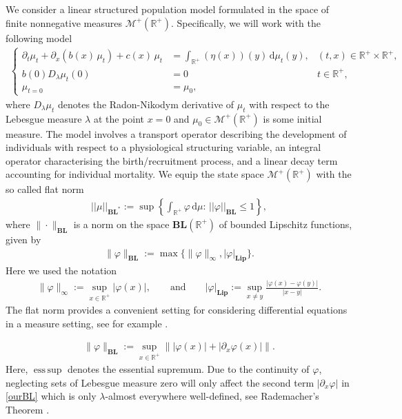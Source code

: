 \documentclass[12pt,a4paper]{amsart}
\newcommand{\ud}{\mathrm{d}}
\newcommand{\BL}{\mathbf{BL}}
\newcommand{\BLN}{\mathbf{BL}}
\newcommand{\Lip}{\mathbf{Lip}} 				%
\DeclareMathOperator*{\esssup}{ess\,sup}
\renewcommand{\phi}{\varphi}
\newcommand{\R}{\mathbb{R}}
\begin{document}
\noindent We consider a linear structured population model formulated in the space of finite nonnegative measures $\mathcal{M}^+(\R^+)$. Specifically, we will work with the following model 
\begin{align}\label{Model}
\left\{\begin{array}{lll}
\partial_t \mu_t+\partial_x \left(b(x) \, \mu_t \right)+c(x)\,\mu_t &= \displaystyle\int_{\R^+} (\eta(x))(y)\, \ud\mu_t(y),& (t,x) \in  \R^+ \times \R^+,\\ 
    b(0)D_{\lambda}\mu_t(0)&= 0& t \in \R^+,\\
    \mu_{t=0}&=\mu_0,
\end{array}\right.
  \end{align}
where $D_{\lambda}\mu_t$ denotes the Radon-Nikodym derivative of $\mu_t$ with respect to the Lebesgue measure $\lambda$ at the point $x=0$ and $\mu_0 \in  \mathcal{M}^+(\R^+)$ is some initial measure. The model involves a transport operator describing the development of individuals with respect to a physiological structuring variable, an integral operator characterising the birth/recruitment process, and a li\-ne\-ar decay term accounting for individual mor\-ta\-li\-ty. 
We equip the state space $\mathcal{M}^+(\R^+)$ with the so called flat norm
    \begin{align}
    \label{new_flat}
    ||\mu||_{\BLN^*}:=\sup\left\{\int_{\R^+}\phi\,\ud \mu:\,||\phi||_{\BLN}\le 1\right\},
    \end{align}
where  $\|\cdot\|_{\BLN}$ is a norm on the space $\BL(\mathbb{R}^+)$ of bounded Lipschitz functions, given by 
\begin{align}
    \label{ourBL}
    \|\phi\|_{\BL}:=\max\{ \|\phi\|_{\infty}, |\phi|_{\Lip}\}.
    \end{align}   
Here we used the notation 
    \begin{align*}
    \|\phi\|_{\infty}:=\displaystyle\sup_{x\in\R^+}\left|\phi(x)\right|,\qquad \text{and} \qquad
    |\phi|_{\Lip}:=\displaystyle\sup_{x\neq y}\frac{|\phi(x)-\phi(y)|}{|x-y|}.
    \end{align*}
The flat norm provides a convenient setting for considering differential equations in a measure setting, see for example \cite{MR4330732,Duell_book, M3AS_measures}.

  \iffalse %
   
   {\color{blue} \begin{align}
    \label{ourBL}
    \|\phi\|_{\BLN}:=\sup_{x\in \R^+}\left\||\phi(x)|+|\partial_x \phi(x)|\right\|.
\end{align}
Here, $\esssup$ denotes the essential supremum. Due to the continuity of $\varphi$, neglecting sets of Lebesgue measure zero will only affect the second term $|\partial_x \varphi|$ in \eqref{ourBL} which is only $\lambda$-almost everywhere well-defined, see  Rademacher's Theorem \cite[Thm 3.2]{EvansGariepy}.   }
\end{document}

